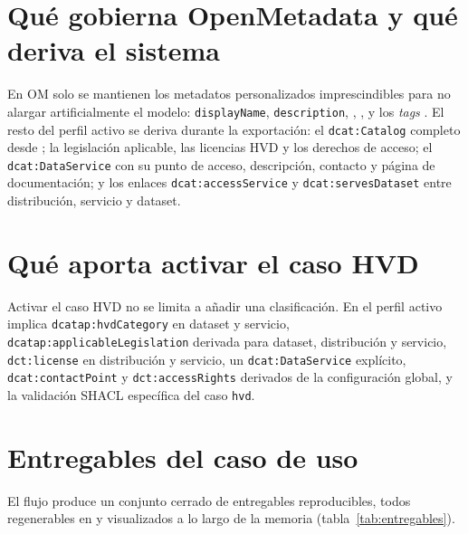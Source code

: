 \section{Qué gobierna OpenMetadata y qué deriva el sistema}

En \ac{OM} solo se mantienen los metadatos personalizados imprescindibles para
no alargar artificialmente el modelo: \texttt{displayName}, \texttt{description},
, ,  y los
\emph{tags} . El resto del perfil activo se deriva durante la
exportación: el \texttt{dcat:Catalog} completo desde ;
la legislación aplicable, las licencias \ac{HVD} y los derechos de acceso; el
\texttt{dcat:DataService} con su punto de acceso, descripción, contacto y página
de documentación; y los enlaces \texttt{dcat:accessService} y
\texttt{dcat:servesDataset} entre distribución, servicio y dataset.

\section{Qué aporta activar el caso HVD}

Activar el caso \ac{HVD} no se limita a añadir una clasificación. En el perfil
activo implica \texttt{dcatap:hvdCategory} en dataset y servicio,
\texttt{dcatap:applicableLegislation} derivada para dataset, distribución y
servicio, \texttt{dct:license} en distribución y servicio, un
\texttt{dcat:DataService} explícito, \texttt{dcat:contactPoint} y
\texttt{dct:accessRights} derivados de la configuración global, y la validación
\ac{SHACL} específica del caso \texttt{hvd}.

\section{Entregables del caso de uso}\label{sec:entregables}

El flujo produce un conjunto cerrado de entregables reproducibles, todos
regenerables en  y visualizados a lo largo de la memoria
(tabla~\ref{tab:entregables}).


